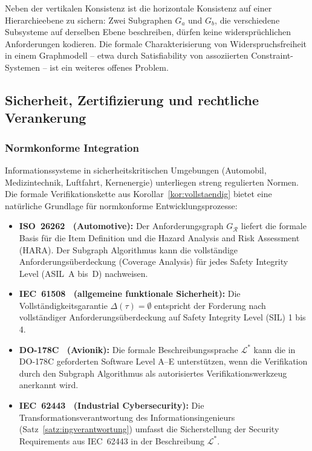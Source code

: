 ﻿\documentclass[a4paper,12pt]{article}
\theoremstyle{definition}
\begin{document}
Neben der vertikalen Konsistenz ist die horizontale Konsistenz auf einer Hierarchieebene
zu sichern: Zwei Subgraphen $G_a$ und $G_b$, die verschiedene Subsysteme auf derselben
Ebene beschreiben, dürfen keine widersprüchlichen Anforderungen kodieren. Die formale
Charakterisierung von Widerspruchsfreiheit in einem Graphmodell -- etwa durch
Satisfiability von assoziierten Constraint-Systemen -- ist ein weiteres offenes Problem.

\subsection{Sicherheit, Zertifizierung und rechtliche Verankerung}

\subsubsection{Normkonforme Integration}

Informationssysteme in sicherheitskritischen Umgebungen (Automobil, Medizintechnik,
Luftfahrt, Kernenergie) unterliegen streng regulierten Normen.
Die formale Verifikationskette aus Korollar~\ref{kor:vollstaendig} bietet eine
natürliche Grundlage für normkonforme Entwicklungsprozesse:

\begin{itemize}
  \item \textbf{ISO~26262~\cite{iso26262} (Automotive):}
        Der Anforderungsgraph $G_\mathcal{R}$ liefert die formale Basis für die
        Item Definition und die Hazard Analysis and Risk Assessment (HARA).
        Der Subgraph Algorithmus kann die vollständige Anforderungsüberdeckung
        (Coverage Analysis) für jedes Safety Integrity Level (ASIL~A bis~D) nachweisen.
  \item \textbf{IEC~61508~\cite{iec61508} (allgemeine funktionale Sicherheit):}
        Die Vollständigkeitsgarantie $\Delta(\tau) = \emptyset$ entspricht der
        Forderung nach vollständiger Anforderungsüberdeckung auf Safety Integrity
        Level (SIL) 1 bis 4.
  \item \textbf{DO-178C~\cite{do178c} (Avionik):}
        Die formale Beschreibungssprache $\mathcal{L}^*$ kann die in DO-178C
        geforderten Software Level A--E unterstützen, wenn die Verifikation durch
        den Subgraph Algorithmus als autorisiertes Verifikationswerkzeug anerkannt wird.
  \item \textbf{IEC~62443~\cite{iec62443} (Industrial Cybersecurity):}
        Die Transformationsverantwortung des Informationsingenieurs (Satz~\ref{satz:ingverantwortung})
        umfasst die Sicherstellung der Security Requirements aus IEC~62443 in der
        Beschreibung $\mathcal{L}^*$.
\end{itemize}
\end{document}
